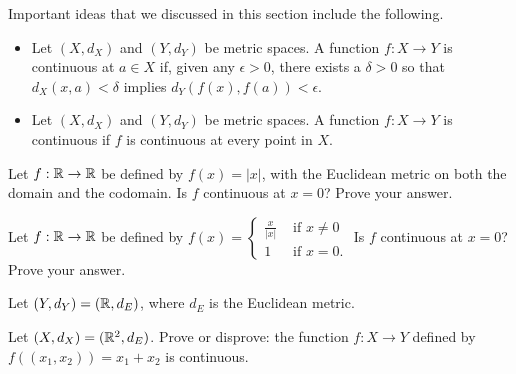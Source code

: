 Important ideas that we discussed in this section include the following.
\begin{itemize}
\item Let $(X,d_X)$ and $(Y, d_Y)$ be metric spaces. A function $f:X \to Y$ is continuous at $a \in X$ if, given any $\epsilon > 0$, there exists a $\delta > 0$ so that $d_X(x,a)< \delta$ implies $d_Y(f(x), f(a)) < \epsilon$.  

\item Let $(X,d_X)$ and $(Y, d_Y)$ be metric spaces. A function $f:X \to Y$ is continuous if $f$ is continuous at every point in $X$.
\end{itemize}


\be

\item Let $f: \mathbb{R} \to \mathbb{R}$ be defined by $f(x) = |x|$, with the Euclidean metric on both the domain and the codomain. Is $f$ continuous at $x=0$? Prove your answer.

\begin{comment}

\ExerciseSolution The answer is yes. Let $\epsilon$ be greater than $0$. Let $\delta = \epsilon$. Then $|x - 0| < \delta$ means that $|x| < \delta$. Then $|f(x)-f(0)| = |x| < \delta = \epsilon$. So $f$ is continuous at $0$. 

\end{comment}

\item Let $f: \mathbb{R} \to \mathbb{R}$ be defined by $f(x) = \begin{cases} \frac{x}{|x|} &\text{ if } x \neq 0 \\ 1 &\text{ if } x=0. \end{cases}$ Is $f$ continuous at $x=0$? Prove your answer.

\begin{comment}

\ExerciseSolution The answer is no. Let $\epsilon$ be greater than $0$ and less than $1$, and let $\delta$ be greater than $0$. If $x \in (0, \delta)$, then $f(x) = 1$. Then $|x - 0| < \delta$ implies that 
\[|f(x)-f(0)| = |1-0|  = 1 > \epsilon.\]   


\end{comment}


\item Let $(Y, d_Y) = (\mathbb{R}, d_E)$, where $d_E$ is the Euclidean metric. %
\ba
\item Let $(X,d_X) = (\mathbb{R}^2, d_E)$.  Prove or disprove: the function $f:X \to Y$ defined by $f((x_1,x_2)) = x_1 + x_2$ is continuous. 

